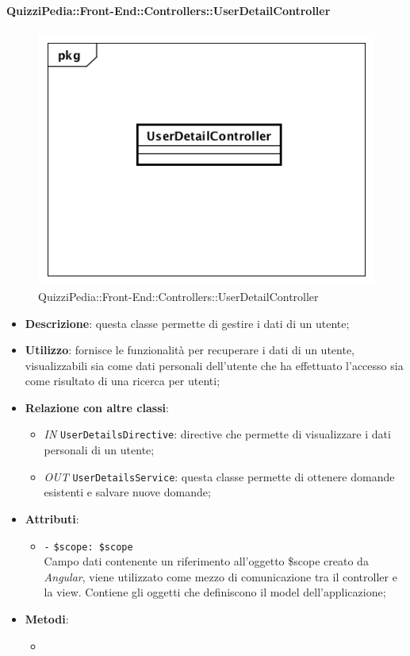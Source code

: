 \paragraph{QuizziPedia::Front-End::Controllers::UserDetailController}
\begin{figure}
	\centering
	\includegraphics[scale=0.45]{UML/Classi/Front-End/QuizziPedia_Front-end_Controller_UserDetailController.png}
	\caption{QuizziPedia::Front-End::Controllers::UserDetailController}
\end{figure}
\begin{itemize}
	\item \textbf{Descrizione}: questa classe permette di gestire i dati di un utente;
	\item \textbf{Utilizzo}: fornisce le funzionalità per recuperare i dati di un utente, visualizzabili sia come dati personali dell'utente che ha effettuato l'accesso sia come risultato di una ricerca per utenti;
	\item \textbf{Relazione con altre classi}:
	\begin{itemize}
		\item \textit{IN} \texttt{UserDetailsDirective}: directive che permette di visualizzare i dati personali di un utente;
		\item \textit{OUT} \texttt{UserDetailsService}: questa classe permette di ottenere domande esistenti e salvare nuove domande;
	\end{itemize}
	\item \textbf{Attributi}:
	\begin{itemize}
		\item \texttt{-} \texttt{\$scope: \$scope} \\
		Campo dati contenente un riferimento all’oggetto \$scope creato da \textit{Angular}, viene utilizzato come mezzo di comunicazione tra il controller e la view. Contiene gli oggetti che definiscono il model dell’applicazione;
	\end{itemize}
	\item \textbf{Metodi}:
	\begin{itemize}
		\item 
	\end{itemize}
\end{itemize}

